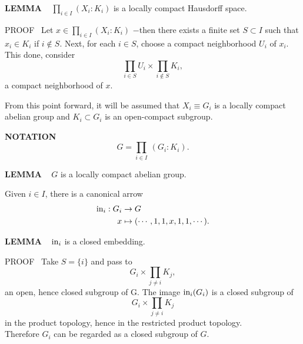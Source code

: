 \vspace{0.1cm}

\begin{x}{\small\bf LEMMA} \ %
$\prod_{i \in I} (X_i : K_i)$ is a locally compact Hausdorff space.

\vspace{0.1cm}

PROOF \  
Let $x \in \prod\limits_{i \in I} (X_i:K_i)$ $-$then there exists a finite set $S \subset I$ such that $x_i \in K_i$ if $i \notin S$.  
Next, for each $i \in S$, choose a compact neighborhood $U_i$ of $x_i$.  
This done, consider
\[
\prod_{i \in S} U_i \times \prod_{i \notin S} K_i,
\]
a compact neighborhood of $x$.
\end{x}

\vspace{0.1cm}


From this point forward, it will be assumed that $X_i \equiv G_i$ is a locally compact abelian group and $K_i \subset G_i$ is an open-compact subgroup.
\vspace{0.2cm}

\begin{x}{\small\bf NOTATION} \ %
\[
G = \prod_{i \in I} \ (G_i:K_i).
\]
\end{x}

\vspace{0.1cm}


\begin{x}{\small\bf LEMMA} \ %
$G$ is a locally compact abelian group.  
\end{x}

\vspace{0.1cm}

Given $i \in I$, there is a canonical arrow
\begin{align*}
\text{in}_i : G_i	&\rightarrow G\\	
x			&\mapsto (\cdots, 1, 1, x, 1, 1, \cdots).\\	
\end{align*}


\begin{x}{\small\bf LEMMA} \ %
$\text{in}_i$ is a closed embedding.

\vspace{0.1cm}

PROOF \ 
Take $S = \{i\}$ and pass to
\[
G_i \times \prod_{j \ne i} K_j,
\]
an open, hence closed subgroup of G.  The image $\text{in}_i(G_i)$ is a closed subgroup of
\[
G_i \times \prod_{j \ne i} K_j
\]
in the product topology, hence in the restricted product topology.\\

Therefore $G_i$ can be regarded as a closed subgroup of $G$.
\end{x}

